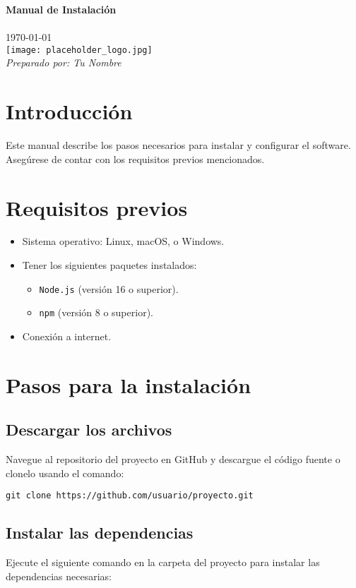 \documentclass[11pt]{article}
\newcommand{\manualTitle}{
    \begin{center}
    \vspace*{3cm}
    {\Huge\bfseries\color{myTitleColor} Manual de Instalación}\\[1.5em]
    {\Large \textbf{\reportTitle}} \\[1em]
    {\large \today}\\[4em]
    \texttt{[image: placeholder\_logo.jpg]}\\[4em]
    \vfill
    \textit{Preparado por: Tu Nombre}\\
    \end{center}
}
\begin{document}
    \thispagestyle{empty} %
    \manualTitle
    \newpage

    \tableofcontents
    \newpage

    \section{Introducción}
    Este manual describe los pasos necesarios para instalar y configurar el software. Asegúrese de contar con los requisitos previos mencionados.

    \section{Requisitos previos}
    \begin{itemize}
        \item Sistema operativo: Linux, macOS, o Windows.
        \item Tener los siguientes paquetes instalados:
        \begin{itemize}
            \item \texttt{Node.js} (versión 16 o superior).
            \item \texttt{npm} (versión 8 o superior).
        \end{itemize}
        \item Conexión a internet.
    \end{itemize}

    \section{Pasos para la instalación}
    \subsection{Descargar los archivos}
    Navegue al repositorio del proyecto en GitHub y descargue el código fuente o clonelo usando el comando:

    \begin{verbatim}
git clone https://github.com/usuario/proyecto.git
    \end{verbatim}

    \subsection{Instalar las dependencias}
    Ejecute el siguiente comando en la carpeta del proyecto para instalar las dependencias necesarias:
\end{document}
